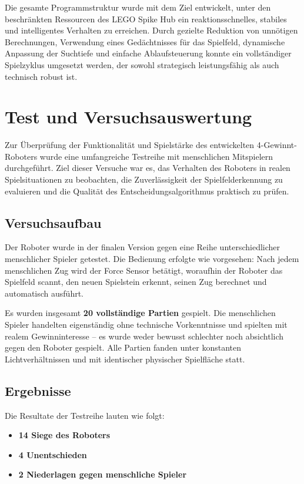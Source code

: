 Die gesamte Programmstruktur wurde mit dem Ziel entwickelt, unter den beschränkten Ressourcen des LEGO Spike Hub ein reaktionsschnelles, stabiles und intelligentes Verhalten zu erreichen. Durch gezielte Reduktion von unnötigen Berechnungen, Verwendung eines Gedächtnisses für das Spielfeld, dynamische Anpassung der Suchtiefe und einfache Ablaufsteuerung konnte ein vollständiger Spielzyklus umgesetzt werden, der sowohl strategisch leistungsfähig als auch technisch robust ist.

\chapter{Test und Versuchsauswertung}

Zur Überprüfung der Funktionalität und Spielstärke des entwickelten 4-Gewinnt-Roboters wurde eine umfangreiche Testreihe mit menschlichen Mitspielern durchgeführt. Ziel dieser Versuche war es, das Verhalten des Roboters in realen Spielsituationen zu beobachten, die Zuverlässigkeit der Spielfelderkennung zu evaluieren und die Qualität des Entscheidungsalgorithmus praktisch zu prüfen.

\section{Versuchsaufbau}

Der Roboter wurde in der finalen Version gegen eine Reihe unterschiedlicher menschlicher Spieler getestet. Die Bedienung erfolgte wie vorgesehen: Nach jedem menschlichen Zug wird der Force Sensor betätigt, woraufhin der Roboter das Spielfeld scannt, den neuen Spielstein erkennt, seinen Zug berechnet und automatisch ausführt.

Es wurden insgesamt \textbf{20 vollständige Partien} gespielt. Die menschlichen Spieler handelten eigenständig ohne technische Vorkenntnisse und spielten mit realem Gewinninteresse – es wurde weder bewusst schlechter noch absichtlich gegen den Roboter gespielt. Alle Partien fanden unter konstanten Lichtverhältnissen und mit identischer physischer Spielfläche statt.

\section{Ergebnisse}

Die Resultate der Testreihe lauten wie folgt:

\begin{itemize}
	\item \textbf{14 Siege des Roboters}
	\item \textbf{4 Unentschieden}
	\item \textbf{2 Niederlagen gegen menschliche Spieler}
\end{itemize}

